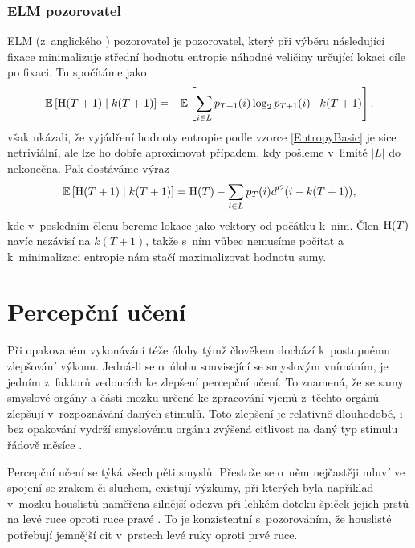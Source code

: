 \subsubsection{ELM pozorovatel}

ELM (z~anglického ) pozorovatel je
pozorovatel, který při výběru následující fixace minimalizuje střední hodnotu
entropie náhodné veličiny určující lokaci cíle po fixaci. Tu spočítáme jako
\begin{equation}\label{EntropyBasic}\mathbb{E}\left[\operatorname{H}(T+1)\mid k(T+1)\right]=-\mathbb{E}\left[\displaystyle\sum_{i\in
L}p_{T+1}(i)\log_2p_{T+1}(i)\mid k(T+1)\right].\end{equation} \citet{Najemnik09} však ukázali,
že vyjádření hodnoty entropie podle vzorce \eqref{EntropyBasic} je sice
netriviální, ale lze ho dobře aproximovat případem, kdy pošleme v~limitě $|L|$
do nekonečna. Pak dostáváme výraz $$ \mathbb{E}\left[\operatorname{H}(T+1)\mid k(T+1)\right]= \operatorname{H}(T) -
\displaystyle\sum_{i\in L} p_T(i)d'^2(i-k(T+1)),$$ kde v~posledním členu bereme
lokace jako vektory od počátku k~nim. Člen $\operatorname{H}(T)$ navíc nezávisí na $k(T+1)$,
takže s~ním vůbec nemusíme počítat a k~minimalizaci entropie nám stačí
maximalizovat hodnotu sumy.


\section{Percepční učení}

Při opakovaném vykonávání téže úlohy týmž člověkem dochází k~postupnému
zlepšování výkonu. Jedná-li se o~úlohu související se smyslovým vnímáním, je
jedním z~faktorů vedoucích ke zlepšení percepční učení. To znamená, že se samy
smyslové orgány a části mozku určené ke zpracování vjemů z~těchto orgánů
zlepšují v~rozpoznávání daných stimulů. Toto zlepšení je relativně dlouhodobé,
i bez opakování vydrží smyslovému orgánu zvýšená citlivost na daný typ stimulu
řádově měsíce \citep{uceni2}.

Percepční učení se týká všech pěti smyslů. Přestože se o~něm nejčastěji mluví
ve spojení se zrakem či sluchem, existují výzkumy, při kterých byla například v~mozku
houslistů naměřena silnější odezva při lehkém doteku špiček jejich prstů na levé ruce oproti ruce pravé \citep{violinists}. To je konzistentní s~pozorováním,
že houslisté potřebují jemnější cit v~prstech levé ruky oproti prvé ruce.

